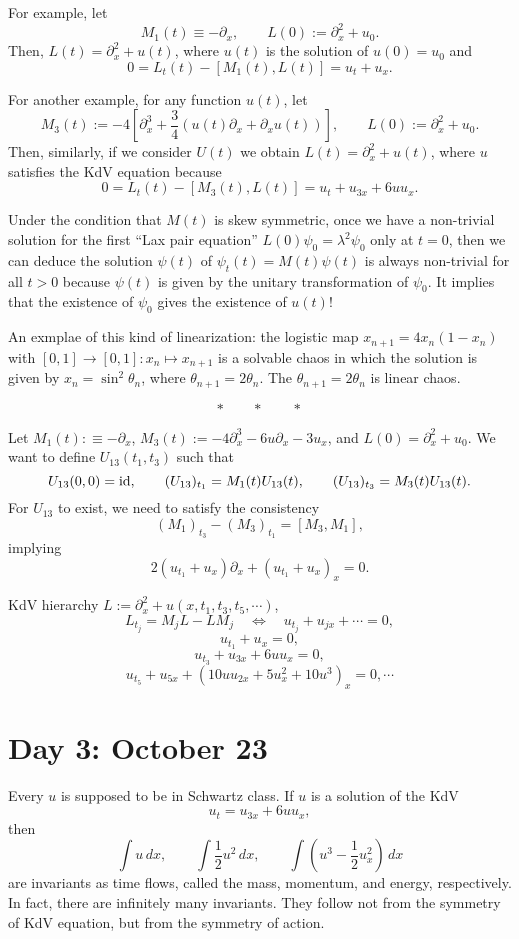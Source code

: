 \documentclass{../../../small}
\begin{document}
For example, let
\[M_1(t)\equiv-\partial_x,\qquad L(0):=\partial_x^2+u_0.\]
Then, $L(t)=\partial_x^2+u(t)$, where $u(t)$ is the solution of $u(0)=u_0$ and
\[0=L_t(t)-[M_1(t),L(t)]=u_t+u_x.\]

For another example, for any function $u(t)$, let
\[M_3(t):=-4[\partial_x^3+\frac34(u(t)\partial_x+\partial_xu(t))],\qquad L(0):=\partial_x^2+u_0.\]
Then, similarly, if we consider $U(t)$ we obtain $L(t)=\partial_x^2+u(t)$, where $u$ satisfies the KdV equation because
\[0=L_t(t)-[M_3(t),L(t)]=u_t+u_{3x}+6uu_x.\]

Under the condition that $M(t)$ is skew symmetric, once we have a non-trivial solution for the first ``Lax pair equation'' $L(0)\psi_0=\lambda^2\psi_0$ only at $t=0$, then we can deduce the solution $\psi(t)$ of $\psi_t(t)=M(t)\psi(t)$ is always non-trivial for all $t>0$ because $\psi(t)$ is given by the unitary transformation of $\psi_0$.
It implies that the existence of $\psi_0$ gives the existence of $u(t)$!

An exmplae of this kind of linearization: the logistic map $x_{n+1}=4x_n(1-x_n)$ with $[0,1]\to[0,1]:x_n\mapsto x_{n+1}$ is a solvable chaos in which the solution is given by $x_n=\sin^2\theta_n$, where $\theta_{n+1}=2\theta_n$.
The $\theta_{n+1}=2\theta_n$ is linear chaos.

\[*\qquad*\qquad*\]
\smallskip

Let $M_1(t):\equiv-\partial_x$, $M_3(t):=-4\partial_x^3-6u\partial_x-3u_x$, and $L(0)=\partial_x^2+u_0$.
We want to define $U_{13}(t_1,t_3)$ such that
\[U_{13}(0,0)=\operatorname{id},\qquad (U_{13})_{t_1}=M_1(t)U_{13}(t),\qquad (U_{13})_{t_3}=M_3(t)U_{13}(t).\]
For $U_{13}$ to exist, we need to satisfy the consistency
\[(M_1)_{t_3}-(M_3)_{t_1}=[M_3,M_1],\]
implying
\[2(u_{t_1}+u_x)\partial_x+(u_{t_1}+u_x)_x=0.\]

KdV hierarchy
$L:=\partial_x^2+u(x,t_1,t_3,t_5,\cdots)$,
\[L_{t_j}=M_jL-LM_j\quad\Leftrightarrow\quad u_{t_j}+u_{jx}+\cdots=0,\]
\[u_{t_1}+u_x=0,\]
\[u_{t_3}+u_{3x}+6uu_x=0,\]
\[u_{t_5}+u_{5x}+(10uu_{2x}+5u_x^2+10u^3)_x=0,\cdots\]



\newpage
\section{Day 3: October 23}

Every $u$ is supposed to be in Schwartz class.
If $u$ is a solution of the KdV
\[u_t=u_{3x}+6uu_x,\]
then
\[\int u\,dx,\qquad\int\frac12u^2\,dx,\qquad\int(u^3-\frac12u_x^2)\,dx\]
are invariants as time flows, called the mass, momentum, and energy, respectively.
In fact, there are infinitely many invariants.
They follow not from the symmetry of KdV equation, but from the symmetry of action.
\end{document}
